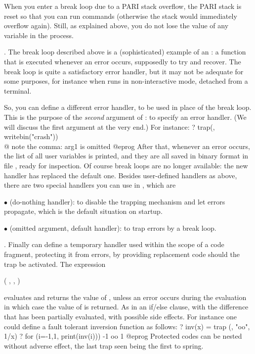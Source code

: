  When you enter a break loop due to a PARI stack
overflow, the PARI stack is reset so that you can run commands (otherwise the
stack would immediately overflow again). Still, as explained above, you do
not lose the value of any  variable in the process.

. The break loop described above is a (sophisticated)
example of an : a function that is executed whenever an
error occurs, supposedly to try and recover. The break loop is quite a
satisfactory error handler, but it may not be adequate for some purposes, for
instance when  runs in non-interactive mode, detached from a
terminal.

So, you can define a different error handler, to be used in place of the
break loop. This is the purpose of the \emph{second} argument of :
to specify an error handler. (We will discuss the first argument at the very
end.) For instance:
\bprog
  ? trap(, writebin("crash"))  \\@ note the comma: arg1 is omitted
@eprog
\noindent After that, whenever an error occurs, the list of all user
variables is printed, and they are all saved in binary format in file
, ready for inspection. Of course break loops are no longer
available: the new handler has replaced the default one. Besides user-defined
handlers as above, there are two special handlers you can use in ,
which are

$\bullet$  (do-nothing handler): to disable the trapping
mechanism and let errors propagate, which is the default situation on
startup.

$\bullet$   (omitted argument, default handler): to trap errors
by a break loop.

. Finally  can define a temporary handler
used within the scope of a code fragment, protecting it from errors, by
providing replacement code should the trap be activated. The expression

  ( , , )

\noindent evaluates and returns the value of , unless an
error occurs during the evaluation in which case the value of 
is returned. As in an if/else clause, with the difference that
 has been partially evaluated, with possible side effects.
For instance one could define a fault tolerant inversion function as follows:
\bprog
? inv(x) = trap (, "oo", 1/x)
? for (i=-1,1, print(inv(i)))
-1
oo
1
@eprog
\noindent Protected codes can be nested without adverse effect, the last trap
seen being the first to spring.

